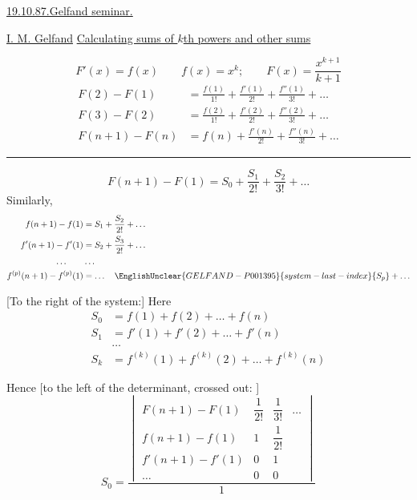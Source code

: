 \underline{19.10.87.}\quad \underline{Gelfand seminar.}

\underline{I. M. Gelfand}\quad
\underline{Calculating sums of $k$th powers and other sums}


\begin{equation*}
F'(x)=f(x)\qquad f(x)=x^k;\qquad F(x)=\frac{x^{k+1}}{k+1}
\end{equation*}
\begin{align*}
F(2)-F(1)&=\frac{f(1)}{1!}+\frac{f'(1)}{2!}+\frac{f''(1)}{3!}+\ldots\\
F(3)-F(2)&=\frac{f(2)}{1!}+\frac{f'(2)}{2!}+\frac{f''(2)}{3!}+\ldots\\[8pt]
F(n+1)-F(n)&=f(n)+\frac{f'(n)}{2!}+\frac{f''(n)}{3!}+\ldots
\end{align*}
\rule{9cm}{0.3pt}
\begin{equation*}
F(n+1)-F(1)=S_0+\frac{S_1}{2!}+\frac{S_2}{3!}+\ldots
\end{equation*}
Similarly,
\begin{align*}
f(n+1)-f(1)&=S_1+\frac{S_2}{2!}+\ldots\\
f'(n+1)-f'(1)&=S_2+\frac{S_3}{2!}+\ldots\\
\ldots\qquad&\ldots\\
f^{(p)}(n+1)-f^{(p)}(1)&=\ldots\quad
\EnglishUnclear{GELFAND-P001395}{system-last-index}{S_p}+\ldots
\end{align*}

[To the right of the system:]
Here
\begin{align*}
S_0&=f(1)+f(2)+\ldots+f(n)\\
S_1&=f'(1)+f'(2)+\ldots+f'(n)\\
&\ldots\\
S_k&=f^{(k)}(1)+f^{(k)}(2)+\ldots+f^{(k)}(n)
\end{align*}

Hence
[to the left of the determinant, crossed out:
]
\begin{equation*}
S_0=\frac{
\begin{vmatrix}
F(n+1)-F(1)&\dfrac{1}{2!}&\dfrac{1}{3!}&\ldots\\
f(n+1)-f(1)&1&\dfrac{1}{2!}&\\
f'(n+1)-f'(1)&0&1&\\
\ldots&0&0&
\end{vmatrix}}{1}
\end{equation*}

